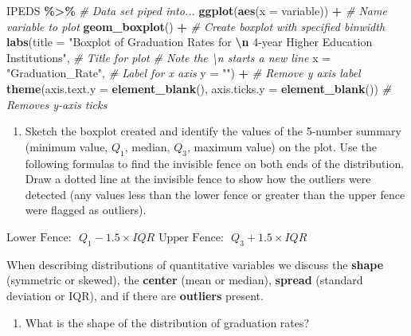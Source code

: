 \documentclass[
]{report}
\newenvironment{Shaded}{\begin{snugshade}}{\end{snugshade}}
\newcommand{\AttributeTok}[1]{\textcolor[rgb]{0.13,0.29,0.53}{#1}}
\newcommand{\CommentTok}[1]{\textcolor[rgb]{0.56,0.35,0.01}{\textit{#1}}}
\newcommand{\FunctionTok}[1]{\textcolor[rgb]{0.13,0.29,0.53}{\textbf{#1}}}
\newcommand{\NormalTok}[1]{#1}
\newcommand{\SpecialCharTok}[1]{\textcolor[rgb]{0.81,0.36,0.00}{\textbf{#1}}}
\newcommand{\StringTok}[1]{\textcolor[rgb]{0.31,0.60,0.02}{#1}}
\providecommand{\tightlist}{%
  \setlength{\itemsep}{0pt}\setlength{\parskip}{0pt}}
\begin{document}
\begin{Shaded}
\begin{Highlighting}[]
\NormalTok{IPEDS }\SpecialCharTok{\%\textgreater{}\%} \CommentTok{\# Data set piped into...}
\FunctionTok{ggplot}\NormalTok{(}\FunctionTok{aes}\NormalTok{(}\AttributeTok{x =}\NormalTok{ variable)) }\SpecialCharTok{+}   \CommentTok{\# Name variable to plot}
  \FunctionTok{geom\_boxplot}\NormalTok{() }\SpecialCharTok{+}  \CommentTok{\# Create boxplot with specified binwidth}
  \FunctionTok{labs}\NormalTok{(}\AttributeTok{title =} \StringTok{"Boxplot of Graduation Rates for }\SpecialCharTok{\textbackslash{}n}\StringTok{ 4{-}year Higher Education Institutions"}\NormalTok{, }
           \CommentTok{\# Title for plot}
           \CommentTok{\# Note the \textbackslash{}n starts a new line}
       \AttributeTok{x =} \StringTok{"Graduation\_Rate"}\NormalTok{, }\CommentTok{\# Label for x axis}
       \AttributeTok{y =} \StringTok{""}\NormalTok{) }\SpecialCharTok{+} \CommentTok{\# Remove y axis label}
    \FunctionTok{theme}\NormalTok{(}\AttributeTok{axis.text.y =} \FunctionTok{element\_blank}\NormalTok{(), }
          \AttributeTok{axis.ticks.y =} \FunctionTok{element\_blank}\NormalTok{()) }\CommentTok{\# Removes y{-}axis ticks}
\end{Highlighting}
\end{Shaded}

\begin{enumerate}
\def\labelenumi{\arabic{enumi}.}
\setcounter{enumi}{6}
\tightlist
\item
  Sketch the boxplot created and identify the values of the 5-number summary (minimum value, \(Q_1\), median, \(Q_3\), maximum value) on the plot. Use the following formulas to find the invisible fence on both ends of the distribution. Draw a dotted line at the invisible fence to show how the outliers were detected (any values less than the lower fence or greater than the upper fence were flagged as outliers).
\end{enumerate}

\(\text{Lower Fence:} ~~~ Q_1 - 1.5\times IQR\) \(\text{Upper Fence:} ~~~ Q_3 + 1.5\times IQR\)
\vspace{1.8in}

When describing distributions of quantitative variables we discuss the \textbf{shape} (symmetric or skewed), the \textbf{center} (mean or median), \textbf{spread} (standard deviation or IQR), and if there are \textbf{outliers} present.

\begin{enumerate}
\def\labelenumi{\arabic{enumi}.}
\setcounter{enumi}{7}
\tightlist
\item
  What is the shape of the distribution of graduation rates?
\end{enumerate}
\end{document}
